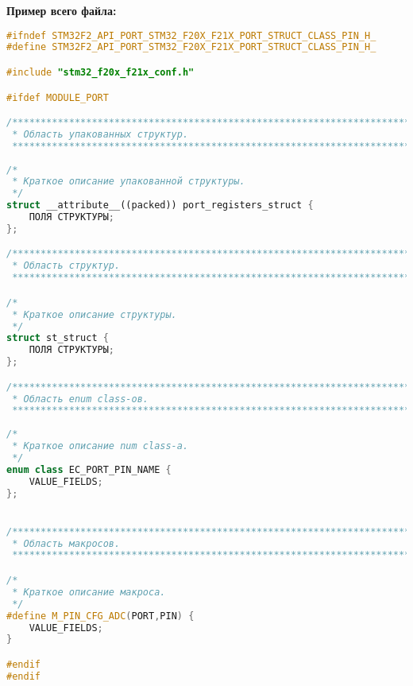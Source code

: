 \textbf{Пример всего файла:}\begin{lstlisting}[language=C++, frame=tlBR, basicstyle=\fontsize{10}{10}\ttfamily]
#ifndef STM32F2_API_PORT_STM32_F20X_F21X_PORT_STRUCT_CLASS_PIN_H_
#define STM32F2_API_PORT_STM32_F20X_F21X_PORT_STRUCT_CLASS_PIN_H_

#include "stm32_f20x_f21x_conf.h"

#ifdef MODULE_PORT

/**********************************************************************
 * Область упакованных структур.
 **********************************************************************/
 
/*
 * Краткое описание упакованной структуры.
 */
struct __attribute__((packed)) port_registers_struct {
	ПОЛЯ СТРУКТУРЫ;
};

/**********************************************************************
 * Область структур.
 **********************************************************************/

/*
 * Краткое описание структуры.
 */
struct st_struct {
	ПОЛЯ СТРУКТУРЫ;
};

/**********************************************************************
 * Область enum class-ов.
 **********************************************************************/
 
/*
 * Краткое описание num class-а.
 */
enum class EC_PORT_PIN_NAME {
	VALUE_FIELDS;
};


/**********************************************************************
 * Область макросов.
 **********************************************************************/

/*
 * Краткое описание макроса.
 */
#define M_PIN_CFG_ADC(PORT,PIN)	{
	VALUE_FIELDS;
}

#endif
#endif
 \end{lstlisting}